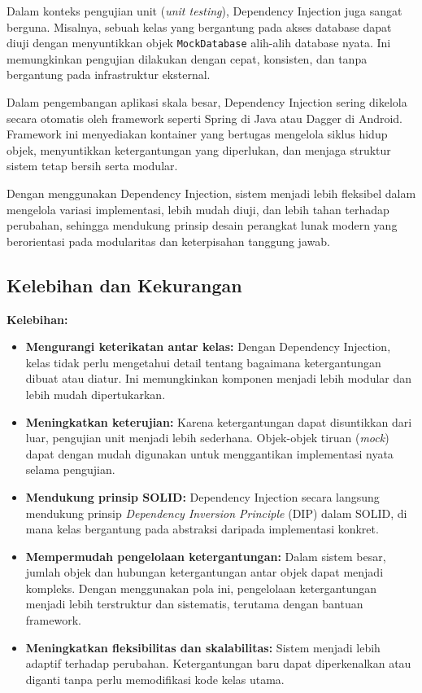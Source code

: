 Dalam konteks pengujian unit (\textit{unit testing}), Dependency Injection juga sangat berguna. Misalnya, sebuah kelas yang bergantung pada akses database dapat diuji dengan menyuntikkan objek \texttt{MockDatabase} alih-alih database nyata. Ini memungkinkan pengujian dilakukan dengan cepat, konsisten, dan tanpa bergantung pada infrastruktur eksternal.

Dalam pengembangan aplikasi skala besar, Dependency Injection sering dikelola secara otomatis oleh framework seperti Spring di Java atau Dagger di Android. Framework ini menyediakan kontainer yang bertugas mengelola siklus hidup objek, menyuntikkan ketergantungan yang diperlukan, dan menjaga struktur sistem tetap bersih serta modular.

Dengan menggunakan Dependency Injection, sistem menjadi lebih fleksibel dalam mengelola variasi implementasi, lebih mudah diuji, dan lebih tahan terhadap perubahan, sehingga mendukung prinsip desain perangkat lunak modern yang berorientasi pada modularitas dan keterpisahan tanggung jawab.


\subsection{Kelebihan dan Kekurangan}

\textbf{Kelebihan:}
\begin{itemize}
\item \textbf{Mengurangi keterikatan antar kelas:} Dengan Dependency Injection, kelas tidak perlu mengetahui detail tentang bagaimana ketergantungan dibuat atau diatur. Ini memungkinkan komponen menjadi lebih modular dan lebih mudah dipertukarkan.

\item \textbf{Meningkatkan keterujian:} Karena ketergantungan dapat disuntikkan dari luar, pengujian unit menjadi lebih sederhana. Objek-objek tiruan (\textit{mock}) dapat dengan mudah digunakan untuk menggantikan implementasi nyata selama pengujian.

\item \textbf{Mendukung prinsip SOLID:} Dependency Injection secara langsung mendukung prinsip \textit{Dependency Inversion Principle} (DIP) dalam SOLID, di mana kelas bergantung pada abstraksi daripada implementasi konkret.

\item \textbf{Mempermudah pengelolaan ketergantungan:} Dalam sistem besar, jumlah objek dan hubungan ketergantungan antar objek dapat menjadi kompleks. Dengan menggunakan pola ini, pengelolaan ketergantungan menjadi lebih terstruktur dan sistematis, terutama dengan bantuan framework.

\item \textbf{Meningkatkan fleksibilitas dan skalabilitas:} Sistem menjadi lebih adaptif terhadap perubahan. Ketergantungan baru dapat diperkenalkan atau diganti tanpa perlu memodifikasi kode kelas utama.
\end{itemize}

